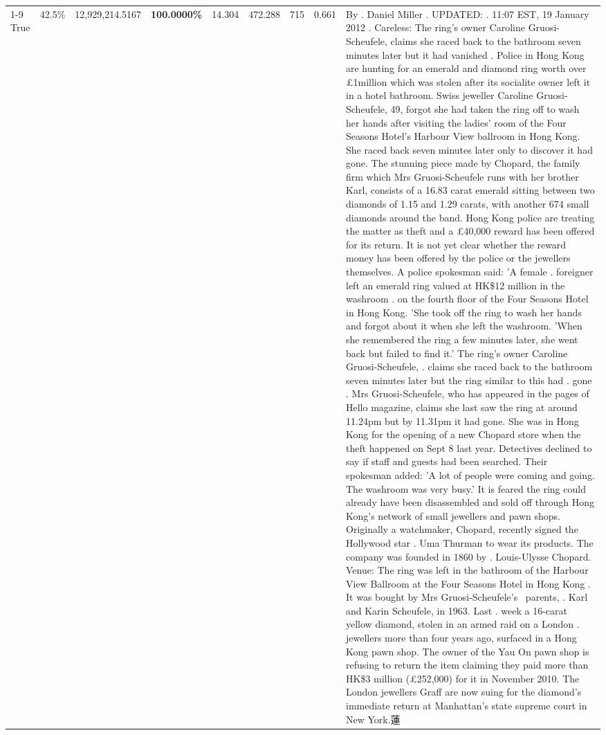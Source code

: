 \begin{table}[H]
\begin{tabular}{lllrlllll}
\cline{1-9}
True & 42.5\% & 12,929,214.5167 & \bfseries \color{red} 100.0000\% & 14.304 & 472.288 & 715 & 0.661 & By . Daniel Miller . UPDATED: . 11:07 EST, 19 January 2012 . Careless: The ring's owner Caroline Gruosi-Scheufele, claims she raced back to the bathroom seven minutes later but it had vanished . Police in Hong Kong are hunting for an emerald and diamond ring worth over £1million which was stolen after its socialite owner left it in a hotel bathroom. Swiss jeweller Caroline Gruosi-Scheufele, 49, forgot she had taken the ring off to wash her hands after visiting the ladies' room of the Four Seasons Hotel's Harbour View ballroom in Hong Kong. She raced back seven minutes later only to discover it had gone. The stunning piece made by Chopard, the family firm which Mrs Gruosi-Scheufele runs with her brother Karl, consists of a 16.83 carat emerald sitting between two diamonds of 1.15 and 1.29 carats, with another 674 small diamonds around the band. Hong Kong police are treating the matter as theft and a £40,000 reward has been offered for its return. It is not yet clear whether the reward money has been offered by the police or the jewellers themselves. A police spokesman said: 'A female . foreigner left an emerald ring valued at HK\$12 million in the washroom . on the fourth floor of the Four Seasons Hotel in Hong Kong. 'She took off the ring to wash her hands and forgot about it when she left the washroom. 'When she remembered the ring a few minutes later, she went back but failed to find it.' The ring's owner Caroline Gruosi-Scheufele, . claims she raced back to the bathroom seven minutes later but the ring similar to this had . gone . Mrs Gruosi-Scheufele, who has appeared in the pages of Hello magazine, claims she last saw the ring at around 11.24pm but by 11.31pm it had gone. She was in Hong Kong for the opening of a new Chopard store when the theft happened on Sept 8 last year. Detectives declined to say if staff and guests had been searched. Their spokesman added: 'A lot of people were coming and going. The washroom was very busy.' It is feared the ring could already have been disassembled and sold off through Hong Kong's network of small jewellers and pawn shops. Originally a watchmaker, Chopard, recently signed the Hollywood star . Uma Thurman to wear its products. The company was founded in 1860 by . Louis-Ulysse Chopard. Venue: The ring was left in the bathroom of the Harbour View Ballroom at the Four Seasons Hotel in Hong Kong . It was bought by Mrs Gruosi-Scheufele's  parents, . Karl and Karin Scheufele, in 1963. Last . week a 16-carat yellow diamond, stolen in an armed raid on a London . jewellers more than four years ago, surfaced in a Hong Kong pawn shop. The owner of the Yau On pawn shop is refusing to return the item claiming they paid more than HK\$3 million (£252,000) for it in November 2010. The London jewellers Graff are now suing for the diamond’s immediate return at Manhattan’s state supreme court in New York.蓮 \\

\end{tabular}
\end{table}
